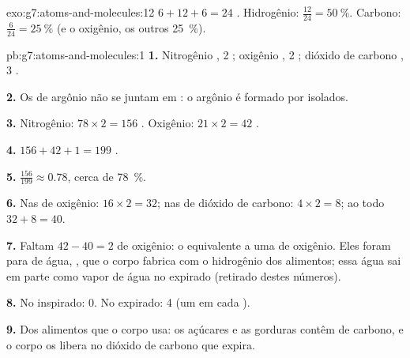 \begin{solution}{exo:g7:atoms-and-molecules:12}
$6 + 12 + 6 = 24$ . Hidrogênio: $\frac{12}{24} = \qty{50}{\percent}$.
Carbono: $\frac{6}{24} = \qty{25}{\percent}$ (e o oxigênio, os outros
\qty{25}{\percent}).
\end{solution}

\begin{solution}{pb:g7:atoms-and-molecules:1}
\textbf{1.} Nitrogênio , 2 ; oxigênio , 2 ;
dióxido de carbono , 3 .

\textbf{2.} Os  de argônio não se juntam em : o argônio
é formado por  isolados.

\textbf{3.} Nitrogênio: $78 \times 2 = 156$ . Oxigênio: $21\times 2 =
42$ .

\textbf{4.} $156 + 42 + 1 = 199$ .

\textbf{5.} $\frac{156}{199} \approx 0.78$, cerca de \qty{78}{\percent}.

\textbf{6.} Nas  de oxigênio: $16\times 2 = 32$; nas 
de dióxido de carbono: $4 \times 2 = 8$; ao todo $32 + 8 = 40$.

\textbf{7.} Faltam $42 - 40 = 2$  de oxigênio: o equivalente a uma
 de oxigênio. Eles foram para  de água, , que o
corpo fabrica com o hidrogênio dos alimentos; essa água sai em parte
como vapor de água no  expirado (retirado destes números).

\textbf{8.} No  inspirado: 0. No  expirado: 4 (um em cada ).

\textbf{9.} Dos alimentos que o corpo usa: os açúcares e as gorduras
contêm  de carbono, e o corpo os libera no dióxido de carbono que
expira.


\end{solution}
